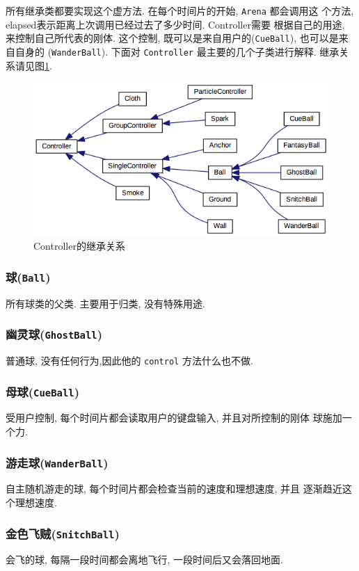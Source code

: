 \documentclass[11pt]{article}
\begin{document}
所有继承类都要实现这个虚方法. 在每个时间片的开始, \texttt{Arena} 都会调用这
个方法, elapsed表示距离上次调用已经过去了多少时间. Controller需要
根据自己的用途, 来控制自己所代表的刚体. 这个控制, 既可以是来自用户的(\texttt{CueBall}), 也可以是来自自身的
(\texttt{WanderBall}). 下面对 \texttt{Controller} 最主要的几个子类进行解释.
继承关系请见图\ref{fig:controller_inherit}.

\begin{figure}[h]
\centering
\includegraphics[width=\textwidth]{html/inherit_graph_3.png}
\caption{Controller的继承关系}
\label{fig:controller_inherit}
\end{figure}
\subsubsection{球(\texttt{Ball})}
\label{sec-3-1-3}
所有球类的父类. 主要用于归类, 没有特殊用途.
\subsubsection{幽灵球(\texttt{GhostBall})}
\label{sec-3-1-4}
普通球, 没有任何行为,因此他的 \texttt{control} 方法什么也不做.
\subsubsection{母球(\texttt{CueBall})}
\label{sec-3-1-5}
受用户控制, 每个时间片都会读取用户的键盘输入, 并且对所控制的刚体
球施加一个力.
\subsubsection{游走球(\texttt{WanderBall})}
\label{sec-3-1-6}
自主随机游走的球, 每个时间片都会检查当前的速度和理想速度, 并且
逐渐趋近这个理想速度.
\subsubsection{金色飞贼(\texttt{SnitchBall})}
\label{sec-3-1-7}
会飞的球, 每隔一段时间都会离地飞行, 一段时间后又会落回地面.
\end{document}
